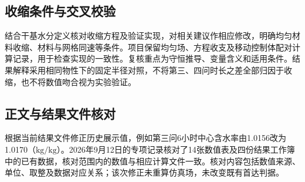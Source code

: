 \documentclass[withoutpreface,bwprint]{commons/cumcmthesis}
\begin{document}
\subsection{收缩条件与交叉校验}
结合干基水分定义核对收缩方程及验证实现，对相关建议作相应修改，明确均匀材料收缩、材料与网格同速等条件。项目保留均匀场、方程收支及移动控制体配对计算记录，用于检查实现的一致性。复核重点为守恒推导、变量含义和适用条件。结果解释采用相同物性下的固定半径对照，不将第三、四问时长之差全部归因于收缩，也不将数值吻合视为实验验证。

\subsection{正文与结果文件核对}
根据当前结果文件修正历史展示值，例如第三问6小时中心含水率由1.0156改为1.0170（$\mathrm{kg/kg}$）。2026年9月12日的专项记录核对了14张数值表及四份结果工作簿中的已有数据，核对范围内的数值与相应计算文件一致。核对内容包括数值来源、单位、取整及数据对应关系；该次修正未重算仿真场，未改变既有首达判据。
\end{document}
